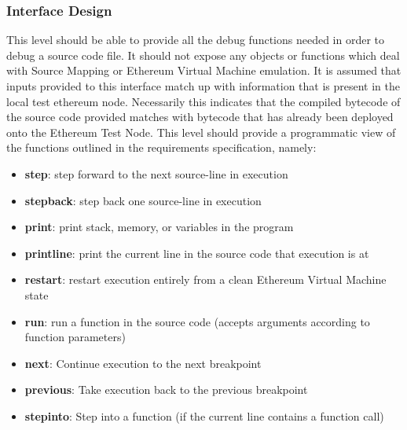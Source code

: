 \documentclass{report}
\begin{document}
    \subsubsection{Interface Design}
        This level should be able to provide all the debug functions needed in order to debug a source code file. It should not expose any objects or functions which deal with Source Mapping or Ethereum Virtual Machine emulation. It is assumed that inputs provided to this interface match up with information that is present in the local test ethereum node. Necessarily this indicates that the compiled bytecode of the source code provided matches with bytecode that has already been deployed onto the Ethereum Test Node. This level should provide a programmatic view of the functions outlined in the requirements specification, namely:
    \begin{itemize}
        \item \textbf{step}: step forward to the next source-line in execution
        \item \textbf{stepback}: step back one source-line in execution
        \item \textbf{print}: print stack, memory, or variables in the program
        \item \textbf{printline}: print the current line in the source code that execution is at
        \item \textbf{restart}: restart execution entirely from a clean Ethereum Virtual Machine state
        \item \textbf{run}: run a function in the source code (accepts arguments according to function parameters)
        \item \textbf{next}: Continue execution to the next breakpoint
        \item \textbf{previous}: Take execution back to the previous breakpoint
        \item \textbf{stepinto}: Step into a function (if the current line contains a function call)
    \end{itemize}
\end{document}
